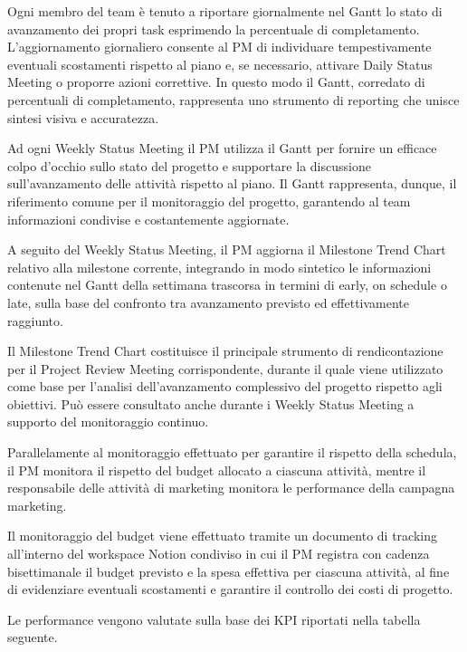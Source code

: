 \documentclass[11pt,a4paper]{article}
\begin{document}
{Ogni membro del team è tenuto a riportare giornalmente nel Gantt lo stato di avanzamento dei propri task esprimendo la percentuale di completamento. L’aggiornamento giornaliero consente al PM di individuare tempestivamente eventuali scostamenti rispetto al piano e, se necessario, attivare Daily Status Meeting o proporre azioni correttive. In questo modo il Gantt, corredato di percentuali di completamento, rappresenta uno strumento di reporting che unisce sintesi visiva e accuratezza.}

{Ad ogni Weekly Status Meeting il PM utilizza il Gantt per fornire un efficace colpo d’occhio sullo stato del progetto e supportare la discussione sull’avanzamento delle attività rispetto al piano. Il Gantt rappresenta, dunque, il riferimento comune per il monitoraggio del progetto, garantendo al team informazioni condivise e costantemente aggiornate.}

{A seguito del Weekly Status Meeting, il PM aggiorna il Milestone Trend Chart relativo alla milestone corrente, integrando in modo sintetico le informazioni contenute nel Gantt della settimana trascorsa in termini di early, on schedule }{o late, }{sulla base del confronto tra avanzamento previsto ed effettivamente raggiunto.}

{Il Milestone Trend Chart costituisce il principale strumento di rendicontazione per il Project Review Meeting corrispondente, durante il quale viene utilizzato come base per l’analisi dell’avanzamento complessivo del progetto rispetto agli obiettivi. Può essere consultato anche durante i Weekly Status Meeting a supporto del monitoraggio continuo.}

\vspace{\baselineskip}

{Parallelamente al monitoraggio effettuato per garantire il rispetto della schedula, il PM monitora il rispetto del budget allocato a ciascuna attività, mentre il responsabile delle attività di marketing monitora le performance della campagna marketing.}

{Il monitoraggio del budget viene effettuato tramite un documento di tracking all’interno del workspace Notion condiviso in cui il PM registra con cadenza bisettimanale il budget previsto e la spesa effettiva per ciascuna attività, al fine di evidenziare eventuali scostamenti e garantire il controllo dei costi di progetto.}

{Le performance vengono valutate sulla base dei KPI riportati nella tabella seguente.}

{}
\end{document}
